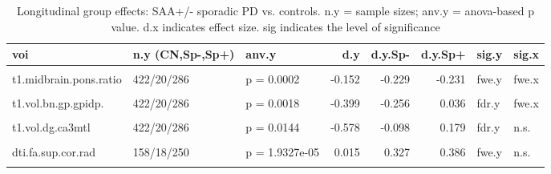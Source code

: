 \documentclass[
  table]{article}
\begin{document}
\begin{landscape}\begin{table}

\caption{\label{tab:dxresultslong}Longitudinal group effects: SAA+/- sporadic PD vs. controls. n.y = sample sizes; anv.y = anova-based p value. d.x indicates effect size. sig indicates the level of significance}
\centering
\begin{tabular}[t]{lllrrrll}
\toprule
voi & n.y (CN,Sp-,Sp+) & anv.y & d.y & d.y.Sp- & d.y.Sp+ & sig.y & sig.x\\
\midrule
\cellcolor{gray!22}{t1.vol.bn.str.pudp.} & \cellcolor{gray!22}{422/20/286} & \cellcolor{gray!22}{p = 1.4056e-11} & \cellcolor{gray!22}{-0.562} & \cellcolor{gray!22}{-0.479} & \cellcolor{gray!22}{-0.276} & \cellcolor{gray!22}{fwe.y} & \cellcolor{gray!22}{fwe.x}\\
t1.midbrain.pons.ratio & 422/20/286 & p = 0.0002 & -0.152 & -0.229 & -0.231 & fwe.y & fwe.x\\
\cellcolor{gray!22}{t1.vol.sncdp.} & \cellcolor{gray!22}{422/20/286} & \cellcolor{gray!22}{p = 0.0005} & \cellcolor{gray!22}{-0.140} & \cellcolor{gray!22}{-0.272} & \cellcolor{gray!22}{-0.135} & \cellcolor{gray!22}{fwe.y} & \cellcolor{gray!22}{fwe.x}\\
t1.vol.bn.gp.gpidp. & 422/20/286 & p = 0.0018 & -0.399 & -0.256 & 0.036 & fdr.y & fwe.x\\
\cellcolor{gray!22}{t1.vol.bn.gp.gpe.asymdp.} & \cellcolor{gray!22}{422/20/286} & \cellcolor{gray!22}{p = 0.0066} & \cellcolor{gray!22}{-0.012} & \cellcolor{gray!22}{0.234} & \cellcolor{gray!22}{0.038} & \cellcolor{gray!22}{fdr.y} & \cellcolor{gray!22}{fwe.x}\\
\addlinespace
t1.vol.dg.ca3mtl & 422/20/286 & p = 0.0144 & -0.578 & -0.098 & 0.179 & fdr.y & n.s.\\
\cellcolor{gray!22}{t1.vol.bn.gp.gpi.asymdp.} & \cellcolor{gray!22}{422/20/286} & \cellcolor{gray!22}{p = 0.0156} & \cellcolor{gray!22}{0.035} & \cellcolor{gray!22}{0.205} & \cellcolor{gray!22}{-0.033} & \cellcolor{gray!22}{fdr.y} & \cellcolor{gray!22}{fwe.x}\\
dti.fa.sup.cor.rad & 158/18/250 & p = 1.9327e-05 & 0.015 & 0.327 & 0.386 & fwe.y & n.s.\\
\cellcolor{gray!22}{dti.mean.md.snc} & \cellcolor{gray!22}{158/18/250} & \cellcolor{gray!22}{p = 4.5422e-05} & \cellcolor{gray!22}{0.070} & \cellcolor{gray!22}{-0.296} & \cellcolor{gray!22}{-0.386} & \cellcolor{gray!22}{fwe.y} & \cellcolor{gray!22}{fwe.x}\\

\end{tabular}
\end{table}
\end{landscape}
\end{document}
